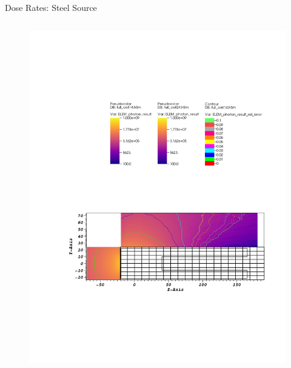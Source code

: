 \documentclass{beamer}
\begin{document}
\begin{frame}{Dose Rates: Steel Source}
\begin{columns}[T]
        \begin{figure}
                \includegraphics[scale=0.49,trim={20cm 16cm 7cm 5cm},clip]{figs/dose_steel_cell_novoid.pdf}
        \end{figure}

\end{columns}
\end{frame}
\end{document}
